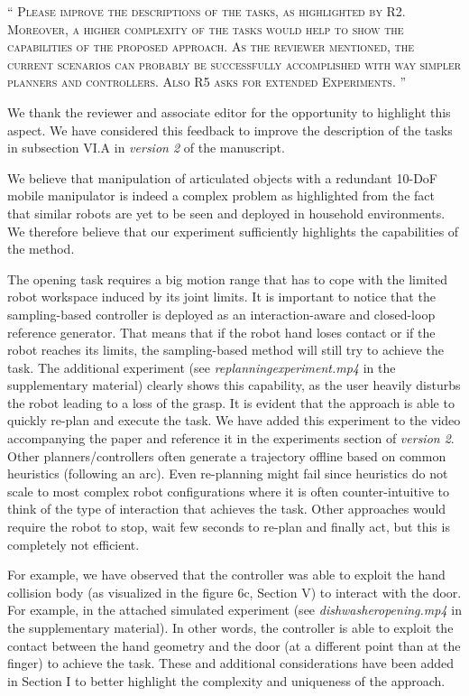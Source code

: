 \documentclass[10pt]{article}
\newcommand{\referee}[1]{\;
  \begin{minipage}[t]{.95\textwidth}
    ``{\small\color{red} \textsc{#1}}''
  \end{minipage}\medskip
  }
\newcommand{\version}[1]{\textit{version #1}}
\begin{document}
\begin{enumerate}[label={[E:\,\arabic{enumi}]}]
\item\label{reply:E1:4} \label{reply:ext:task_description} \referee{Please improve the descriptions of the tasks, as highlighted by R2. Moreover, a higher complexity of the tasks would help to show the capabilities of the proposed approach. As the reviewer mentioned, the current scenarios can probably be successfully accomplished with way
simpler planners and controllers. Also R5 asks for extended Experiments.
}

We thank the reviewer and associate editor for the opportunity to highlight this aspect. We have considered this feedback to improve the description of the tasks in subsection VI.A in \version{2} of the manuscript. 

We believe that manipulation of articulated objects with a redundant 10-DoF mobile manipulator is indeed a complex problem as highlighted from the fact that similar robots are yet to be seen and deployed in household environments. We therefore believe that our experiment sufficiently highlights the capabilities of the method.

The opening task requires a big motion range that has to cope with the limited robot workspace induced by its joint limits. It is important to notice that the sampling-based controller is deployed as an interaction-aware and closed-loop reference generator. That means that if the robot hand loses contact or if the robot reaches its limits, the sampling-based method will still try to achieve the task. The additional experiment (see \emph{replanning\textunderscore experiment.mp4} in the supplementary material) clearly shows this capability, as the  user heavily disturbs the robot leading to a loss of the grasp. It is evident that the approach is able to quickly re-plan and execute the task. We have added this experiment to the video accompanying the paper and reference it in the experiments section of \version{2}. Other planners/controllers often generate a trajectory offline based on common heuristics (following an arc). Even re-planning might fail since heuristics do not scale to most complex robot configurations where it is often counter-intuitive to think of the type of interaction that achieves the task. Other approaches would require the robot to stop, wait few seconds to re-plan and finally act, but this is completely not efficient. 

For example, we have observed that the controller was able to exploit the hand collision body (as visualized in the figure 6c, Section V) to interact with the door. For example, in the attached simulated experiment (see \emph{dishwasher\textunderscore opening.mp4} in the supplementary material). In other words, the controller is able to exploit the contact between the hand geometry and the door (at a different point than at the finger) to achieve the task. These and additional considerations have been added in Section I to better highlight the complexity and uniqueness of the approach.


\end{enumerate}
\end{document}
